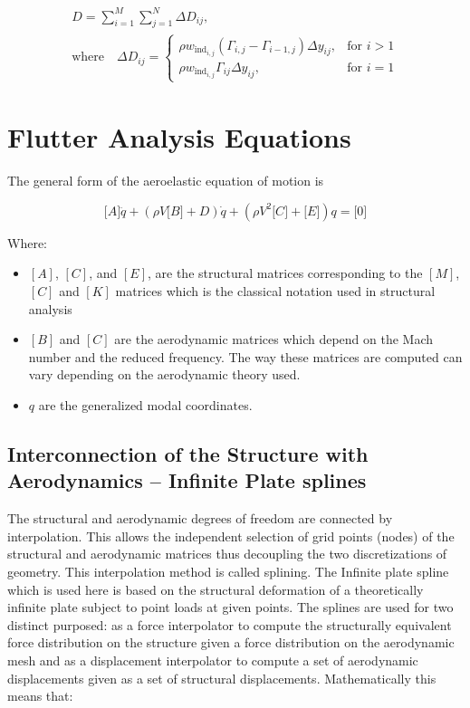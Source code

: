 \begin{multline}
D = \sum_{i = 1}^{M} \sum_{j = 1}^{N} \Delta D_{ij}, \\
\text{where} \quad \Delta D_{ij} = \begin{cases}
    \rho w_{\text{ind}_{i,j}} \left( \Gamma_{i,j} - \Gamma_{i - 1,j} \right) \Delta y_{ij}, & \text{for } i > 1 \\
    \rho w_{\text{ind}_{i,j}} \Gamma_{ij} \Delta y_{ij}, & \text{for } i = 1
\end{cases}
\end{multline}


\section{Flutter Analysis Equations}\label{flutter-analysis-equations}

The general form of the aeroelastic equation of motion is \cite{AeroelasticityWright}

\begin{equation}
    \lbrack A\rbrack\ddot{q} + \left( \rho V\lbrack B\rbrack + D \right)\dot{q} + \left( \rho V^{2}\lbrack C\rbrack + \lbrack E\rbrack \right)q = \lbrack 0\rbrack  
\end{equation}



Where:

\begin{itemize}
\item
  $[A]$, $[C]$, and $[E]$, are the structural matrices corresponding to the $[M]$, $[C]$ and
  $[K]$ matrices which is the classical notation used in structural analysis
\item
  $[B]$ and $[C]$ are the aerodynamic matrices which depend on the Mach number
  and the reduced frequency. The way these matrices are computed can
  vary depending on the aerodynamic theory used.
\item
  $q$ are the generalized modal coordinates.
\end{itemize}


\subsection{Interconnection of the Structure with Aerodynamics -- Infinite Plate splines}\label{interconnection-of-the-structure-with-aerodynamics-infinite-plate-splines}

The structural and aerodynamic degrees of freedom are connected by
interpolation. This allows the independent selection of grid points
(nodes) of the structural and aerodynamic matrices thus decoupling the
two discretizations of geometry. This interpolation method is called
splining. The Infinite plate spline which is used here is based on the
structural deformation of a theoretically infinite plate subject to
point loads at given points. The splines are used for two distinct
purposed: as a force interpolator to compute the structurally equivalent
force distribution on the structure given a force distribution on the
aerodynamic mesh and as a displacement interpolator to compute a set of
aerodynamic displacements given as a set of structural displacements.
Mathematically this means that:

